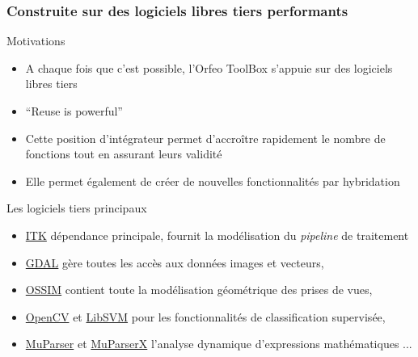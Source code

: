 \documentclass[8pt]{beamer}
\begin{document}
\begin{frame}
\frametitle{Construite sur des logiciels libres tiers performants}
\begin{block}{Motivations}
\begin{itemize}
\item A chaque fois que c'est possible, l'Orfeo ToolBox s'appuie sur des
  logiciels libres tiers
\item ``Reuse is powerful''
\item Cette position d'intégrateur permet d'accroître rapidement le nombre de fonctions tout en assurant leurs validité
\item Elle permet également de créer de nouvelles fonctionnalités par hybridation
\end{itemize} 
\end{block}

\begin{block}{Les logiciels tiers principaux}
\begin{itemize}
\item \href{www.itk.org}{ITK} dépendance principale, fournit la modélisation du \emph{pipeline} de traitement
\item \href{www.gdal.org}{GDAL} gère toutes les accès aux données images et vecteurs,
\item \href{www.ossim.org}{OSSIM} contient toute la modélisation géométrique des prises de vues, 
\item \href{www.opencv.org}{OpenCV} et \href{www.libsvm.org}{LibSVM} pour les fonctionnalités de classification supervisée,
\item \href{www.muparser.org}{MuParser} et \href{www.muparserx.org}{MuParserX} l'analyse dynamique d'expressions mathématiques ...
\end{itemize}
\end{block}


\end{frame}
\end{document}
